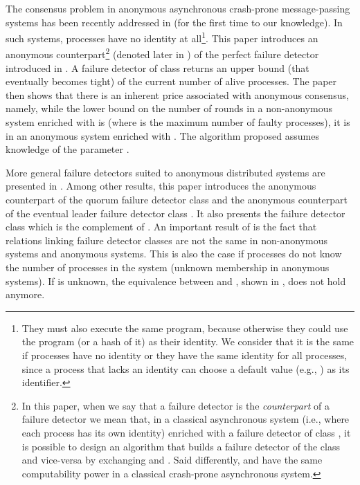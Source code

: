 \documentclass[10pt, conference, compsocconf]{IEEEtran}
\begin{document}
The consensus problem in anonymous asynchronous crash-prone message-passing 
systems  has been  recently addressed  in \cite{DBLP:conf/wdag/BonnetR09} 
(for the first time to our knowledge).  
In such systems, processes have no identity at 
all\footnote{They must also execute the same program, 
because otherwise they could use the program
(or a hash of it) as their identity. 
We consider that it is the same if processes have no identity 
or they have the same identity for all processes, 
since a process that lacks an identity can choose
a default value (e.g., ) as its identifier.}.
This paper introduces an  anonymous counterpart\footnote{In this paper,
when we say that a failure detector  is the  {\it counterpart} 
of  a  failure   detector    we  mean  that,   in  a classical  
asynchronous system  (i.e., where each process  has its own identity) 
enriched    with  a  failure  detector of  class ,  it  is  possible  to
design  an  algorithm that builds  a failure detector  of the class  
and vice-versa  by exchanging   and .  Said differently,   and 
have the same computability power in a classical crash-prone asynchronous 
system.}  (denoted  later in \cite{DBLP:conf/wdag/BonnetR10})  
of  the   perfect  failure detector  
introduced in \cite{DBLP:journals/jacm/ChandraT96}. A failure detector
of class  returns an upper bound (that eventually becomes tight)
of the current number of alive processes. The paper then
shows that  there  is  an inherent  price  associated with anonymous
consensus,  namely,  while the lower bound on the number of rounds in 
a non-anonymous system enriched with   is  (where  is 
the maximum number of faulty processes), it is   
in an anonymous system enriched with  .
The algorithm proposed assumes knowledge of the parameter .

More general failure detectors suited to anonymous  distributed systems are
presented in \cite{DBLP:conf/wdag/BonnetR10}. 
Among other results,  this paper introduces the anonymous counterpart 
of the quorum  failure detector  class 
 \cite{DBLP:journals/jacm/Delporte-GalletFG10} and the 
anonymous counterpart  of the eventual leader  failure detector 
class  \cite{DBLP:journals/jacm/ChandraHT96}. It also presents
the failure detector class  which is the complement of .
An important result of \cite{DBLP:conf/wdag/BonnetR10} 
is the fact that  relations linking  failure detector classes 
are  not the same in non-anonymous systems   and anonymous systems. 
This is also the case
if processes do not know the number  of processes in the system 
(unknown membership in anonymous systems). 
If  is unknown, the equivalence between
 and , 
shown in \cite{DBLP:conf/wdag/BonnetR10}, does not hold anymore.
\end{document}
